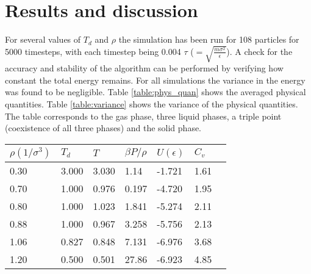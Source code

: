 \section{Results and discussion}
For several values of $T_d$ and $\rho$ the simulation has been run for 108 particles for 5000 timesteps, with each timestep being 0.004 $\tau$ ($=\sqrt{\frac{m\sigma^2}{\epsilon}}$). A check for the accuracy and stability of the algorithm can be performed by verifying how constant the total energy remains. For all simulations the variance in the energy was found to be negligible.
Table \ref{table:phys_quan} shows the averaged physical quantities. Table \ref{table:variance} shows the variance of the physical quantities. The table corresponds to the gas phase, three liquid phases, a triple point (coexistence of all three phases) and the solid phase.
\begin{center}
\begin{tabular}{lllllll}
\hline \hline
$\rho(1/\sigma^3)$ & $T_d$ & $T$ & $\beta P/\rho$ & $U(\epsilon)$ & $C_v$\\
\hline
0.30 & 3.000 & 3.030 & 1.14 & -1.721 & 1.61\\
0.70 & 1.000 & 0.976 & 0.197 & -4.720 & 1.95\\
0.80 & 1.000 & 1.023 & 1.841 & -5.274 & 2.11\\
0.88& 1.000 & 0.967 & 3.258 & -5.756 & 2.13\\
1.06& 0.827&0.848 & 7.131 & -6.976 & 3.68\\
1.20 & 0.500 & 0.501 & 27.86 & -6.923 & 4.85\\
\hline \hline
\end{tabular}
\vspace{-0.1cm}
\label{table:phys_quan}
\end{center}


